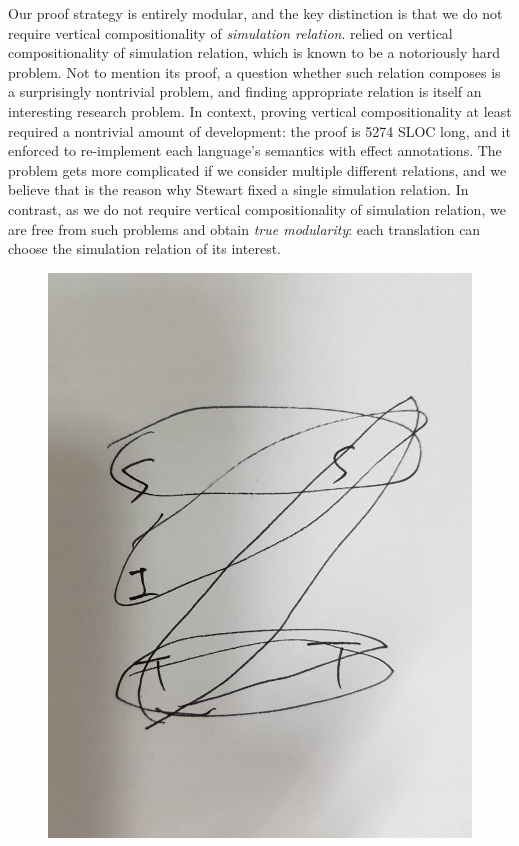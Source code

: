 {Our proof strategy is entirely modular, and the key distinction is that we do not require vertical compositionality of \textit{simulation relation}.
\ccc{} relied on vertical compositionality of simulation relation, which is known to be a notoriously hard problem.
Not to mention its proof, a question whether such relation composes is a surprisingly nontrivial problem, and finding appropriate relation is itself an interesting research problem. \cite{TODO}
In \ccc{} context, proving vertical compositionality at least required a nontrivial amount of development: the proof is 5274 SLOC long, and it enforced to re-implement each language's semantics with effect annotations.
The problem gets more complicated if we consider multiple different relations, and we believe that is the reason why Stewart \etal{} fixed a single simulation relation. %
In contrast, as we do not require vertical compositionality of simulation relation, we are free from such problems and obtain \textit{true modularity}: each translation can choose the simulation relation of its interest.



\begin{figure}
  \centering
  \includegraphics[width=0.35\linewidth]{images/draft-fig.jpg}
  \caption{
  }
  \label{fig:draft-fig}
\end{figure}

}
